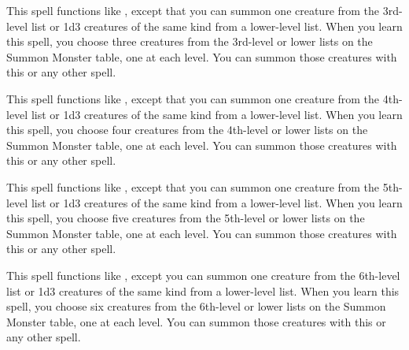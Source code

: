 \begin{spelleffect}
  This spell functions like , except that you can summon one creature from the 3rd-level list or 1d3 creatures of the same kind from a lower-level list. When you learn this spell, you choose three creatures from the 3rd-level or lower lists on the Summon Monster table, one at each level. You can summon those creatures with this or any other  spell.
\end{spelleffect}

\begin{spelleffect}
  This spell functions like , except that you can summon one creature from the 4th-level list or 1d3 creatures of the same kind from a lower-level list. When you learn this spell, you choose four creatures from the 4th-level or lower lists on the Summon Monster table, one at each level. You can summon those creatures with this or any other  spell.
\end{spelleffect}

\begin{spelleffect}
  This spell functions like , except that you can summon one creature from the 5th-level list or 1d3 creatures of the same kind from a lower-level list. When you learn this spell, you choose five creatures from the 5th-level or lower lists on the Summon Monster table, one at each level. You can summon those creatures with this or any other  spell.
\end{spelleffect}

\begin{spelleffect}
  This spell functions like , except you can summon one creature from the 6th-level list or 1d3 creatures of the same kind from a lower-level list. When you learn this spell, you choose six creatures from the 6th-level or lower lists on the Summon Monster table, one at each level. You can summon those creatures with this or any other  spell.
\end{spelleffect}

